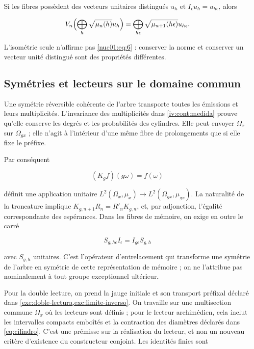 Si les fibres possèdent des vecteurs unitaires distingués \(u_h\) et \(I_\epsilon u_h=u_{h\epsilon}\), alors


\begin{equation}
V_n\Bigl(\bigoplus_h\sqrt{\mu_n(h)}u_h\Bigr)
=\bigoplus_{h\epsilon}\sqrt{\mu_{n+1}(h\epsilon)}u_{h\epsilon}.
\label{nuc01:eq:6}
\end{equation}

L’isométrie seule n’affirme pas \eqref{nuc01:eq:6} : conserver la norme et conserver un vecteur unité distingué sont des propriétés différentes.


\subsection{Symétries et lecteurs sur le domaine commun}

Une symétrie réversible cohérente de l’arbre transporte toutes les émissions et leurs multiplicités. L’invariance des multiplicités dans \cref{iv:cont:medida} prouve qu’elle conserve les degrés et les probabilités des cylindres. Elle peut envoyer \(\Omega_x\) sur \(\Omega_{gx}\) ; elle n’agit à l’intérieur d’une même fibre de prolongements que si elle fixe le préfixe.

Par conséquent

\[
(K_gf)(g\omega)=f(\omega)
\]

définit une application unitaire \(L^2(\Omega_x,\mu_x)\to L^2(\Omega_{gx},\mu_{gx})\). La naturalité de la troncature implique \(K_{g,n+1}R_n=R'_nK_{g,n}\), et, par adjonction, l’égalité correspondante des espérances. Dans les fibres de mémoire, on exige en outre le carré


\[
S_{g,h\epsilon}I_\epsilon=I_{g\epsilon}S_{g,h}
\]

avec \(S_{g,h}\) unitaires. C’est l’opérateur d’entrelacement qui transforme une symétrie de l’arbre en symétrie de cette représentation de mémoire ; on ne l’attribue pas nominalement à tout groupe exceptionnel ultérieur.


Pour la double lecture, on prend la jauge initiale et son transport préfixal déclaré dans \cref{exc:doble-lectura,exc:limite-inverso}. On travaille sur une multisection commune \(\Omega_x\) où les lecteurs sont définis ; pour le lecteur archimédien, cela inclut les intervalles compacts emboîtés et la contraction des diamètres déclarés dans \eqref{eq:cilindro}. C’est une prémisse sur la réalisation du lecteur, et non un nouveau critère d’existence du constructeur conjoint. Les identités finies sont

